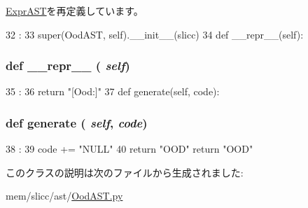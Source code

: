 \hyperlink{classslicc_1_1ast_1_1ExprAST_1_1ExprAST_ac775ee34451fdfa742b318538164070e}{ExprAST}を再定義しています。


\begin{DoxyCode}
32                              :
33         super(OodAST, self).__init__(slicc)
34 
    def __repr__(self):
\end{DoxyCode}
\hypertarget{classslicc_1_1ast_1_1OodAST_1_1OodAST_ad8b9328939df072e4740cd9a63189744}{
\subsubsection[{\_\-\_\-repr\_\-\_\-}]{\setlength{\rightskip}{0pt plus 5cm}def \_\-\_\-repr\_\-\_\- ( {\em self})}}
\label{classslicc_1_1ast_1_1OodAST_1_1OodAST_ad8b9328939df072e4740cd9a63189744}



\begin{DoxyCode}
35                       :
36         return "[Ood:]"
37 
    def generate(self, code):
\end{DoxyCode}
\hypertarget{classslicc_1_1ast_1_1OodAST_1_1OodAST_a4555d1cee0dccf3942ea35fe86de2e8e}{
\subsubsection[{generate}]{\setlength{\rightskip}{0pt plus 5cm}def generate ( {\em self}, \/   {\em code})}}
\label{classslicc_1_1ast_1_1OodAST_1_1OodAST_a4555d1cee0dccf3942ea35fe86de2e8e}



\begin{DoxyCode}
38                             :
39         code += "NULL"
40         return "OOD"
        return "OOD"
\end{DoxyCode}


このクラスの説明は次のファイルから生成されました:\begin{DoxyCompactItemize}
\item 
mem/slicc/ast/\hyperlink{OodAST_8py}{OodAST.py}\end{DoxyCompactItemize}
